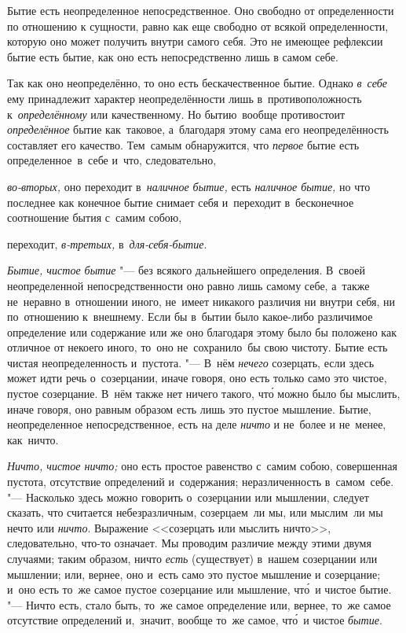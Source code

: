 Бытие есть неопределенное непосредственное. Оно свободно от определенности по
отношению к сущности, равно как еще свободно от всякой определенности, которую
оно может получить внутри самого себя. Это не имеющее рефлексии бытие есть
бытие, как оно есть непосредственно лишь в самом себе.

Так как оно неопределённо, то оно есть бескачественное бытие. Однако
{\em в~себе} ему принадлежит характер неопределённости лишь в~противоположность
к~{\em определённому} или качественному. Но бытию~вообще противостоит
{\em определённое} бытие как~таковое, а~благодаря этому сама его
неопределённость составляет его качество. Тем~самым обнаружится, что
{\em первое} бытие есть определенное~в~себе и~что, следовательно,

{\em во-вторых,} оно переходит в~{\em наличное бытие,} есть
{\em наличное бытие,} но что последнее как конечное бытие снимает себя
и~переходит в~бесконечное соотношение бытия с~самим собою,

переходит, {\em в-третьих,} в~{\em для-себя-бытие}.



{\em Бытие, чистое бытие} "--- без всякого дальнейшего определения.
В~своей неопределенной непосредственности оно равно лишь самому себе, а~также
не~неравно в~отношении иного, не~имеет никакого различия ни внутри себя, ни
по~отношению к~внешнему. Если бы в~бытии было какое-либо различимое определение
или содержание или же оно благодаря этому было бы положено как отличное от
некоего иного, то~оно не~сохранило~бы свою чистоту. Бытие есть чистая
неопределенность и~пустота. "--- В~нём {\em нечего} созерцать, если здесь может
идти речь о~созерцании, иначе говоря, оно есть только само это чистое, пустое
созерцание. В~нём также нет ничего такого, чт\'{о} можно было бы мыслить, иначе
говоря, оно равным образом есть лишь это пустое мышление. Бытие, неопределенное
непосредственное, есть на деле {\em ничто} и не~более и не~менее, как~ничто.


{\em Ничто, чистое ничто;} оно есть простое равенство с~самим собою,
совершенная пустота, отсутствие определений и~содержания; неразличенность
в~самом~себе. "--- Насколько здесь можно говорить о~созерцании или мышлении,
следует сказать, что считается небезразличным, созерцаем~ли мы, или мыслим~ли
мы нечто или {\em ничто}. Выражение <<созерцать или мыслить ничто>>,
следовательно, что-то означает. Мы проводим различие между этими двумя
случаями; таким образом, ничто {\em есть} (существует) в~нашем созерцании или
мышлении; или, вернее, оно и~есть само это пустое мышление и созерцание; и~оно
есть то~же самое пустое созерцание или мышление, чт\'{о}~и чистое бытие. "---
Ничто есть, стало быть, то~же самое определение или, вернее, то~же самое
отсутствие определений и,~значит, вообще то~же самое,
чт\'{о}~и чистое {\em бытие}.

